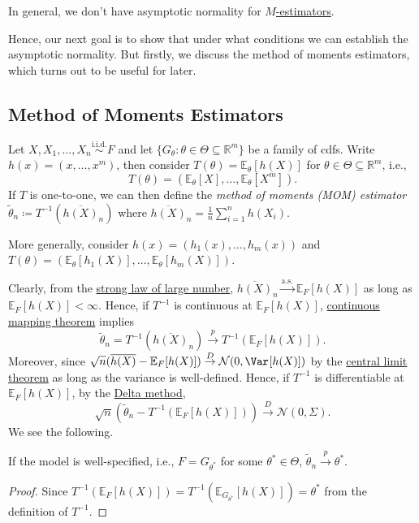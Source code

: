 \begin{remark}
	In general, we don't have asymptotic normality for \hyperref[def:M-estimator]{\(M\)-estimators}.
\end{remark}

Hence, our next goal is to show that under what conditions we can establish the asymptotic normality. But firstly, we discuss the method of moments estimators, which turns out to be useful for later.

\subsection{Method of Moments Estimators}
Let \(X, X_1, \dots , X_n \overset{\text{i.i.d.} }{\sim } F\) and let \(\{ G_\theta \colon \theta \in \Theta \subseteq \mathbb{R} ^m \} \) be a family of cdfs. Write \(h(x) = (x, \dots , x^m)\), then consider \(T(\theta ) = \mathbb{E}_{\theta }[h(X)] \) for \(\theta \in \Theta \subseteq \mathbb{R} ^m\), i.e.,
\[
	T(\theta )
	= (\mathbb{E}_{\theta }[X], \dots , \mathbb{E}_{\theta }[X^m] ).
\]
If \(T\) is one-to-one, we can then define the \emph{method of moments (MOM) estimator} \(\widetilde{\theta} _n \coloneqq T^{-1} (\overline{h(X)} _n)\) where \(\overline{h(X)} _n = \frac{1}{n}\sum_{i=1}^{n} h(X_i)\).

\begin{note}
	More generally, consider \(h(x) = (h_1(x), \dots , h_m(x))\) and \(T(\theta ) = (\mathbb{E}_{\theta }[h_1(X)] , \dots , \mathbb{E}_{\theta }[h_m(X)] )\).
\end{note}

Clearly, from the \hyperref[thm:SLLN]{strong law of large number}, \(\overline{h(X)} _n \overset{\text{a.s.} }{\to} \mathbb{E}_{F}[h(X)] \) as long as \(\mathbb{E}_{F}[h(X)] < \infty \). Hence, if \(T^{-1} \) is continuous at \(\mathbb{E}_{F}[h(X)] \), \hyperref[thm:continuous-mapping]{continuous mapping theorem} implies
\[
	\widetilde{\theta} _n
	= T^{-1} (\overline{h(X)} _n)
	\overset{p}{\to} T^{-1} (\mathbb{E}_{F}[h(X)] ).
\]
Moreover, since \(\sqrt{n} (\overline{h(X)} - \mathbb{E}_{F}[h(X)] ) \overset{D}{\to} \mathcal{N} (0, \Var_{}[h(X)] )\) by the \hyperref[thm:CLT]{central limit theorem} as long as the variance is well-defined. Hence, if \(T^{-1} \) is differentiable at \(\mathbb{E}_{F}[h(X)] \), by the \hyperref[thm:delta-method]{Delta method},
\[
	\sqrt{n} (\widetilde{\theta} _n - T^{-1} (\mathbb{E}_{F}[h(X)] ))
	\overset{D}{\to} \mathcal{N} (0, \Sigma ).
\]
We see the following.

\begin{lemma}\label{lma:MOM-consistency}
	If the model is well-specified, i.e., \(F = G_{\theta ^{\ast} }\) for some \(\theta ^{\ast} \in \Theta \), \(\widetilde{\theta} _n \overset{p}{\to} \theta ^{\ast} \).
\end{lemma}
\begin{proof}
	Since \(T^{-1} (\mathbb{E}_{F}[h(X)] ) = T^{-1} (\mathbb{E}_{G_{\theta ^{\ast} }}[h(X)] ) = \theta ^{\ast} \) from the definition of \(T^{-1} \).
\end{proof}

